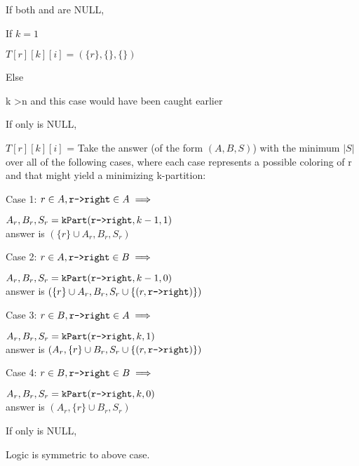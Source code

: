 \documentclass[11pt]{article}
\begin{document}
\begin{indentmore}
    If both \rleft and \rright are NULL,
        \begin{indentmore}
        If $k=1$
            \begin{indentmore}
            $T[r][k][i] = (\{r\}, \{\}, \{\})$
           \end{indentmore}
        Else
            \begin{indentmore}
            k \textgreater n and this case would have been caught earlier
           \end{indentmore}
       \end{indentmore}
    If only \rleft is NULL,
        \begin{indentmore}
        $T[r][k][i]$ = Take the answer (of the form $(A,B,S)$) with the minimum $|S|$ over all of the following cases, where each case represents a possible coloring of r and \rright that might yield a minimizing k-partition:
          \begin{indentmore}
          Case 1: $r \in A, \texttt{r->right} \in A \implies $
            \begin{indentmore}
            $A_r, B_r, S_r = \mathtt{kPart}(\texttt{r->right},k-1,1)$\\
            answer is $(\{r\} \cup A_r, B_r, S_r)$
            \end{indentmore}
          Case 2: $r \in A, \texttt{r->right} \in B \implies $
            \begin{indentmore}
            $A_r, B_r, S_r = \mathtt{kPart}(\texttt{r->right},k-1,0)$\\
            answer is $(\{r\} \cup A_r, B_r, S_r \cup \{(r, \texttt{r->right})\})$
           \end{indentmore}
          Case 3: $r \in B, \texttt{r->right} \in A \implies $
            \begin{indentmore}
            $A_r, B_r, S_r = \mathtt{kPart}(\texttt{r->right},k,1)$\\
            answer is $(A_r,\{r\} \cup B_r, S_r \cup \{(r, \texttt{r->right})\})$
           \end{indentmore}
          Case 4: $r \in B, \texttt{r->right} \in B \implies $
            \begin{indentmore}
            $A_r, B_r, S_r = \mathtt{kPart}(\texttt{r->right},k,0)$\\
            answer is $(A_r,\{r\} \cup B_r, S_r)$
           \end{indentmore}
          \end{indentmore}

       \end{indentmore}
    If only \rright is NULL,
        \begin{indentmore}
        Logic is symmetric to above case.
        \end{indentmore}


\end{indentmore}
\end{document}
